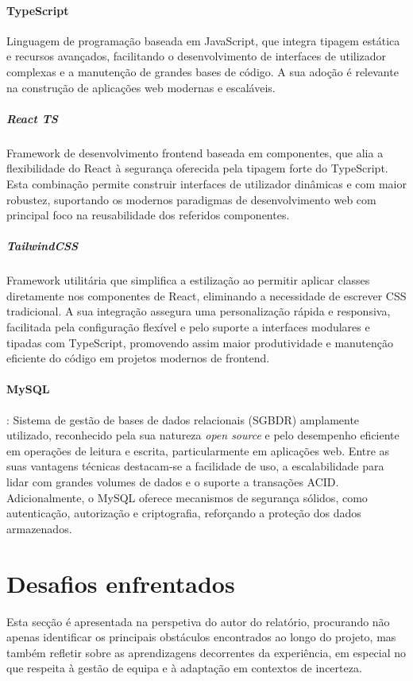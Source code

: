 \paragraph{TypeScript} Linguagem de programação baseada em JavaScript, que integra tipagem estática e recursos avançados, facilitando o desenvolvimento de interfaces de utilizador complexas e a manutenção de grandes bases de código. A sua adoção é relevante na construção de aplicações web modernas e escaláveis.

\subparagraph{React TS} Framework de desenvolvimento frontend baseada em componentes, que alia a flexibilidade do React à segurança oferecida pela tipagem forte do TypeScript. Esta combinação permite construir interfaces de utilizador dinâmicas e com maior robustez, suportando os modernos paradigmas de desenvolvimento web com principal foco na reusabilidade dos referidos componentes.

\subparagraph{TailwindCSS} Framework utilitária que simplifica a estilização ao permitir aplicar classes diretamente nos componentes de React, eliminando a necessidade de escrever CSS tradicional. A sua integração assegura uma personalização rápida e responsiva, facilitada pela configuração flexível e pelo suporte a interfaces modulares e tipadas com TypeScript, promovendo assim maior produtividade e manutenção eficiente do código em projetos modernos de frontend.

\paragraph{MySQL}: Sistema de gestão de bases de dados relacionais (SGBDR) amplamente utilizado, reconhecido pela sua natureza \textit{open source} e pelo desempenho eficiente em operações de leitura e escrita, particularmente em aplicações web. Entre as suas vantagens técnicas destacam-se a facilidade de uso, a escalabilidade para lidar com grandes volumes de dados e o suporte a transações ACID. Adicionalmente, o MySQL oferece mecanismos de segurança sólidos, como autenticação, autorização e criptografia, reforçando a proteção dos dados armazenados.




\section{Desafios enfrentados}

Esta secção é apresentada na perspetiva do autor do relatório, procurando não apenas identificar os principais obstáculos encontrados ao longo do projeto, mas também refletir sobre as aprendizagens decorrentes da experiência, em especial no que respeita à gestão de equipa e à adaptação em contextos de incerteza.

